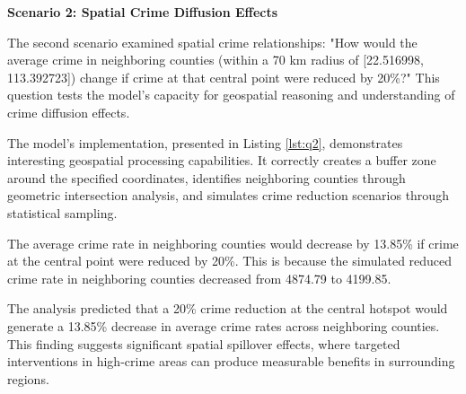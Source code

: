 \noindent \textbf{Scenario 2: Spatial Crime Diffusion Effects}

The second scenario examined spatial crime relationships: "How would the average crime in neighboring counties (within a 70 km radius of [22.516998, 113.392723]) change if crime at that central point were reduced by 20\%?" This question tests the model's capacity for geospatial reasoning and understanding of crime diffusion effects.

The model's implementation, presented in Listing \ref{lst:q2}, demonstrates interesting geospatial processing capabilities. It correctly creates a buffer zone around the specified coordinates, identifies neighboring counties through geometric intersection analysis, and simulates crime reduction scenarios through statistical sampling.



\begin{tcolorbox}[colback=white!95!black, colframe=black, title=Q2 Response, fontupper=\scriptsize, boxsep=2pt, left=3pt, right=3pt]
  The average crime rate in neighboring counties would decrease by 13.85\% if crime at the central point were reduced by 20\%. This is because the simulated reduced crime rate in neighboring counties decreased from 4874.79 to 4199.85.
\end{tcolorbox}

The analysis predicted that a 20\% crime reduction at the central hotspot would generate a 13.85\% decrease in average crime rates across neighboring counties. This finding suggests significant spatial spillover effects, where targeted interventions in high-crime areas can produce measurable benefits in surrounding regions.


